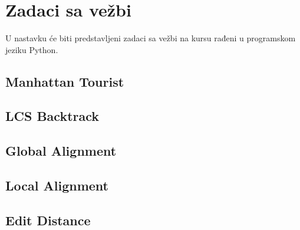 
\newpage
\section{Zadaci sa vežbi}
\setexamplecodestyle

U nastavku će biti predstavljeni zadaci sa vežbi na kursu rađeni u programskom jeziku Python.

\subsection{Manhattan Tourist}



\subsection{LCS Backtrack}



\subsection{Global Alignment}



\subsection{Local Alignment}



\subsection{Edit Distance}

